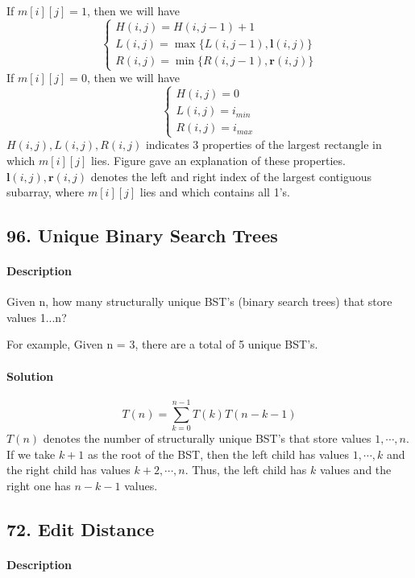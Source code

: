 If $m[i][j]=1$, then we will have
\begin{equation*}
\begin{cases}
H(i,j)=H(i,j-1)+1\\
L(i,j)=\max\{L(i,j-1),\bm{l}(i,j)\}\\
R(i,j)=\min\{R(i,j-1),\bm{r}(i,j)\}
\end{cases}
\end{equation*}
If $m[i][j]=0$, then we will have
\begin{equation*}
\begin{cases}
H(i,j)=0\\
L(i,j)=i_{min}\\
R(i,j)=i_{max}
\end{cases}
\end{equation*}
$H(i,j),L(i,j),R(i,j)$ indicates $3$ properties of the largest rectangle in which $m[i][j]$ lies. Figure gave an explanation of these properties.
$\bm{l}(i,j),\bm{r}(i,j)$ denotes the left and right index of the largest contiguous subarray, where $m[i][j]$ lies and which contains all 1's.
\subsection{96. Unique Binary Search Trees}

\paragraph{Description}

Given n, how many structurally unique BST's (binary search trees) that store values 1...n?

For example,
Given n = 3, there are a total of 5 unique BST's.

\paragraph{Solution}
$$T(n)=\sum^{n-1}_{k=0}{T(k)T(n-k-1)}$$
$T(n)$ denotes the number of structurally unique BST's that store values $1,\cdots,n$. If we take $k+1$ as the root of the BST, then the left child has values $1,\cdots,k$ and the right child has values $k+2,\cdots,n$. Thus, the left child has $k$ values and the right one has $n-k-1$ values.

\subsection{72. Edit Distance}

\paragraph{Description}


